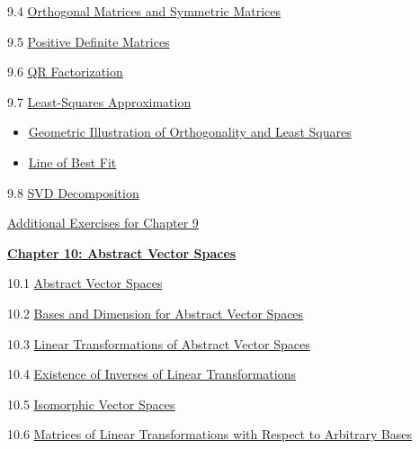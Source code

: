 \documentclass{ximera}
\begin{document}
9.4	\href{https://ximera.osu.edu/linearalgebradzv3/LinearAlgebraInteractiveIntro/RTH-0035/main}{Orthogonal Matrices and Symmetric Matrices}
	
9.5	\href{https://ximera.osu.edu/linearalgebradzv3/LinearAlgebraInteractiveIntro/RTH-0045/main}{Positive Definite Matrices}
	
9.6	\href{https://ximera.osu.edu/linearalgebradzv3/LinearAlgebraInteractiveIntro/RTH-0040/main}{QR Factorization}
	
9.7	\href{https://ximera.osu.edu/linearalgebradzv3/LinearAlgebraInteractiveIntro/RTH-0030/main}{Least-Squares Approximation}
\begin{itemize}
    \item 
    \href{https://www.geogebra.org/classic/mm7wauhw}{Geometric Illustration of Orthogonality and Least Squares}
    \item 
    \href{https://www.geogebra.org/classic/crgw4usb}{Line of Best Fit}
\end{itemize}
	
9.8	\href{https://ximera.osu.edu/linearalgebradzv3/LinearAlgebraInteractiveIntro/RTH-0060/main}{SVD Decomposition}
	
\href{https://ximera.osu.edu/linearalgebradzv3/LinearAlgebraInteractiveIntro/SUPX-0090/main}{Additional Exercises for Chapter 9}
	
\href{https://ximera.osu.edu/linearalgebradzv3/LinearAlgebraInteractiveIntro/XLAChapter_vecSpaces/main}{\textbf{Chapter 10: Abstract Vector Spaces}}
	
10.1	\href{https://ximera.osu.edu/linearalgebradzv3/LinearAlgebraInteractiveIntro/VSP-0050/main}{Abstract Vector Spaces}
	
10.2	\href{https://ximera.osu.edu/linearalgebradzv3/LinearAlgebraInteractiveIntro/VSP-0060/main}{Bases and Dimension for Abstract Vector Spaces}
	
10.3	\href{https://ximera.osu.edu/linearalgebradzv3/LinearAlgebraInteractiveIntro/LTR-0022/main}{Linear Transformations of Abstract Vector Spaces}
	
10.4	\href{https://ximera.osu.edu/linearalgebradzv3/LinearAlgebraInteractiveIntro/LTR-0025/main}{Existence of Inverses of Linear Transformations}
	
10.5	\href{https://ximera.osu.edu/linearalgebradzv3/LinearAlgebraInteractiveIntro/LTR-0035/main}{Isomorphic Vector Spaces}
	
10.6	\href{https://ximera.osu.edu/linearalgebradzv3/LinearAlgebraInteractiveIntro/LTR-0060/main}{Matrices of Linear Transformations with Respect to Arbitrary Bases}
	
\end{document}
